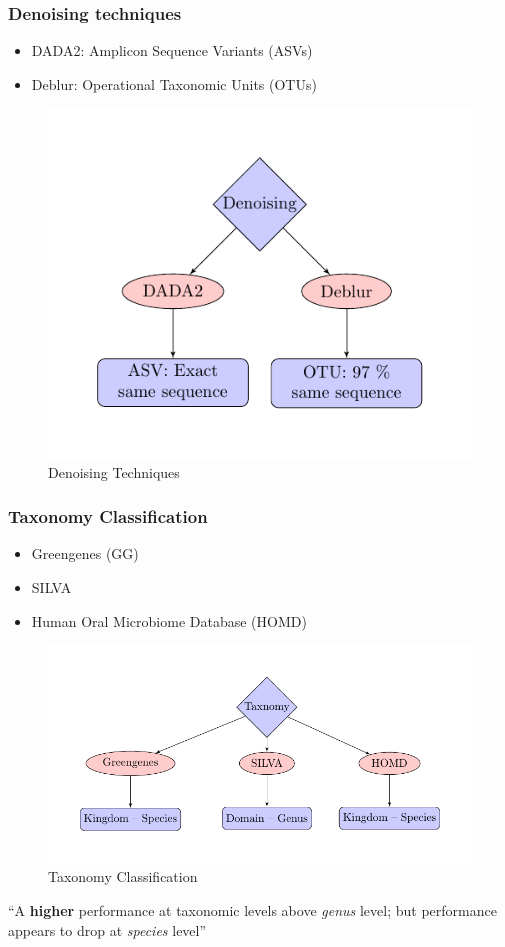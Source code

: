 \documentclass{beamer}
\begin{document}
    \begin{frame}
        \frametitle{Denoising techniques}

        \begin{itemize}
            \item DADA2: Amplicon Sequence Variants (ASVs) \cite{DADA1}
            \item Deblur: Operational Taxonomic Units (OTUs) \cite{deblur1}
        \end{itemize}

        \begin{figure}
            \centering
            \includegraphics[width=0.4 \linewidth]{figures/denoising/denoising.pdf}
            \caption{Denoising Techniques}
            \label{fig:denoising}
        \end{figure}
    \end{frame}

    \begin{frame}
        \frametitle{Taxonomy Classification}

        \begin{itemize}
            \item Greengenes (GG) \cite{greengenes1}
            \item SILVA \cite{silva1}
            \item Human Oral Microbiome Database (HOMD) \cite{homd1}
        \end{itemize}

        \begin{figure}
            \centering
            \includegraphics[width=0.4 \linewidth]{figures/taxonomy/taxonomy.pdf}
            \caption{Taxonomy Classification}
            \label{fig:taxonomy}
        \end{figure}

        “A \textbf{higher} performance at taxonomic levels above \textit{genus} level; but performance appears to drop at \textit{species} level” \cite{performance1}
    \end{frame}
\end{document}
